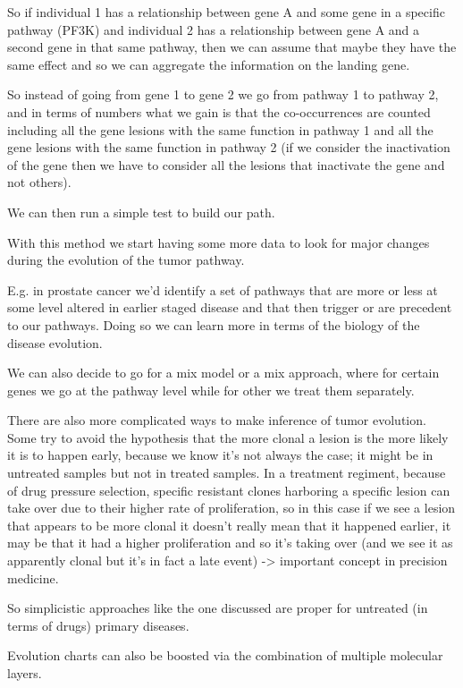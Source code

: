 So if individual 1 has a relationship between gene A and some gene in a specific
pathway (PF3K) and individual 2 has a relationship between gene A and a second
gene in that same pathway, then we can assume that maybe they have the same
effect and so we can aggregate the information on the landing gene.

So instead of going from gene 1 to gene 2 we go from pathway 1 to pathway 2, and
in terms of numbers what we gain is that the co-occurrences are counted
including all the gene lesions with the same function in pathway 1 and all the
gene lesions with the same function in pathway 2 (if we consider the
inactivation of the gene then we have to consider all the lesions that
inactivate the gene and not others).

We can then run a simple test to build our path.

With this method we start having some more data to look for major changes during
the evolution of the tumor pathway.

E.g. in prostate cancer we'd identify a set of pathways that are more or less at
some level altered in earlier staged disease and that then trigger or are
precedent to our pathways. Doing so we can learn more in terms of the biology of
the disease evolution.

We can also decide to go for a mix model or a mix approach, where for certain
genes we go at the pathway level while for other we treat them separately.

There are also more complicated ways to make inference of tumor evolution. Some
try to avoid the hypothesis that the more clonal a lesion is the more likely it
is to happen early, because we know it's not always the case; it might be in
untreated samples but not in treated samples. In a treatment regiment, because
of drug pressure selection, specific resistant clones harboring a specific
lesion can take over due to their higher rate of proliferation, so in this case
if we see a lesion that appears to be more clonal it doesn't really mean that it
happened earlier, it may be that it had a higher proliferation and so it's
taking over (and we see it as apparently clonal but it's in fact a late event)
-\textgreater{} important concept in precision medicine.

So simplicistic approaches like the one discussed are proper for untreated (in
terms of drugs) primary diseases.

Evolution charts can also be boosted via the combination of multiple molecular
layers.

